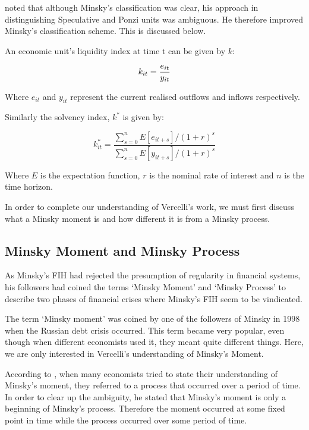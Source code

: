 \documentclass[a4paper, 12pt]{article}
\begin{document}
	 noted that although Minsky's classification was clear, his approach in distinguishing Speculative and Ponzi units was ambiguous. He therefore improved Minsky's classification scheme. This is discussed below.
	
	An economic unit's liquidity index at time t can be given by $k$:
	
	\begin{equation}
		k_{it} = \frac{e_{it}}{y_{it}}\\
	\end{equation}
	
	Where $e_{it}$ and $y_{it}$ represent the current realised outflows and inflows respectively.
	
	Similarly the solvency index, $k^{*}$ is given by:
	
		\begin{equation}
			k^*_{it} = \frac{\sum_{s = 0}^{n} E[e_{it+s}] / (1 + r)^s}{\sum_{s = 0}^{n}E[y_{it+s}] / (1 + r)^s}
		\end{equation}
		
	Where $E$ is the expectation function, $r$ is the nominal rate of interest and $n$ is the time horizon.
	
	In order to complete our understanding of Vercelli's work, we must first discuss what a Minsky moment is and how different it is from a Minsky process.
	
	\subsection{Minsky Moment and Minsky Process}
	As Minsky's FIH had rejected the presumption of regularity in financial systems, his followers had coined the terms `Minsky Moment' and `Minsky Process' to describe two phases of financial crises where Minsky's FIH seem to be vindicated.
	
	The term `Minsky moment' was coined by one of the followers of Minsky in 1998 when the Russian debt crisis occurred. This term became very popular, even though when different economists used it, they meant quite different things. Here, we are only interested in Vercelli's understanding of Minsky's Moment.
	
	According to , when many economists tried to state their understanding of Minsky's moment, they referred to a process that occurred over a period of time. In order to clear up the ambiguity, he stated that Minsky's moment is only a beginning of Minsky's process. Therefore the moment occurred at some fixed point in time while the process occurred over some period of time.
	
\end{document}
